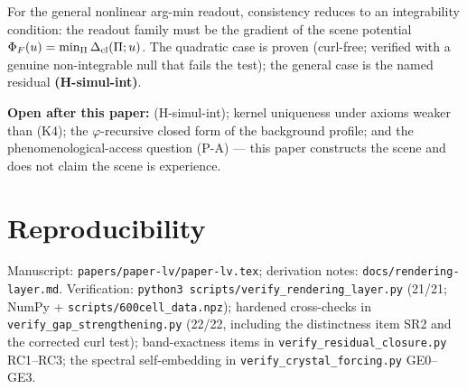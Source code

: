 \documentclass[12pt]{article}
\theoremstyle{definition}
\theoremstyle{remark}
\begin{document}
For the general nonlinear arg-min readout, consistency reduces to an integrability condition: the readout family must be the gradient of the scene potential $\Phi_F(u) = \min_\Pi \Delta_{\rm cl}(\Pi; u)$. The quadratic case is proven (curl-free; verified with a genuine non-integrable null that fails the test); the general case is the named residual \textbf{(H-simul-int)}.

\textbf{Open after this paper:} (H-simul-int); kernel uniqueness under axioms weaker than (K4); the $\varphi$-recursive closed form of the background profile; and the phenomenological-access question (P-A) --- this paper constructs the scene and does not claim the scene is experience.

\section{Reproducibility}\label{sec:repro}

Manuscript: \texttt{papers/paper-lv/paper-lv.tex}; derivation notes: \texttt{docs/rendering-layer.md}. Verification: \texttt{python3 scripts/verify\_rendering\_layer.py} (21/21; NumPy + \texttt{scripts/600cell\_data.npz}); hardened cross-checks in \texttt{verify\_gap\_strengthening.py} (22/22, including the distinctness item SR2 and the corrected curl test); band-exactness items in \texttt{verify\_residual\_closure.py} RC1--RC3; the spectral self-embedding in \texttt{verify\_crystal\_forcing.py} GE0--GE3.



\end{document}
